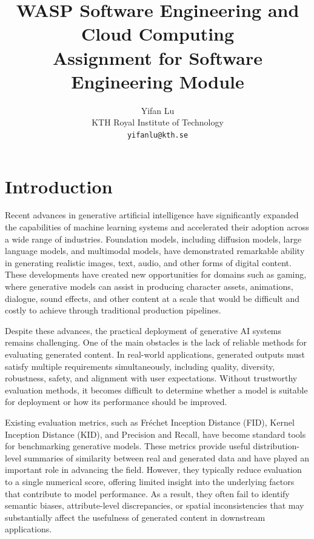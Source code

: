 \documentclass{article}
\title{WASP Software Engineering and Cloud Computing\\ \small{Assignment for Software Engineering Module}}
\author{
  Yifan Lu \\
  KTH Royal Institute of Technology\\
  \texttt{yifanlu@kth.se} \\
}
\begin{document}
\maketitle






\section{Introduction}

Recent advances in generative artificial intelligence have significantly expanded the capabilities of machine learning systems and accelerated their adoption across a wide range of industries. Foundation models, including diffusion models\cite{sohl2015deep, ho2020denoising, nichol2021improved, rombach2022high}, large language models\cite{brown2020language, ouyang2022training}, and multimodal models\cite{radford2021learning, liu2023visual}, have demonstrated remarkable ability in generating realistic images\cite{ho2020denoising, rombach2022high}, text\cite{brown2020language, ouyang2022training}, audio\cite{huang2023make}, and other forms of digital content. These developments have created new opportunities for domains such as gaming, where generative models can assist in producing character assets, animations, dialogue, sound effects, and other content at a scale that would be difficult and costly to achieve through traditional production pipelines.

Despite these advances, the practical deployment of generative AI systems remains challenging. One of the main obstacles is the lack of reliable methods for evaluating generated content. In real-world applications, generated outputs must satisfy multiple requirements simultaneously, including quality, diversity, robustness, safety, and alignment with user expectations. Without trustworthy evaluation methods, it becomes difficult to determine whether a model is suitable for deployment or how its performance should be improved.

Existing evaluation metrics, such as Fréchet Inception Distance (FID)\cite{heusel2017gans}, Kernel Inception Distance (KID)\cite{binkowski2018demystifying}, and Precision and Recall\cite{sajjadi2018assessing}, have become standard tools for benchmarking generative models. These metrics provide useful distribution-level summaries of similarity between real and generated data and have played an important role in advancing the field. However, they typically reduce evaluation to a single numerical score, offering limited insight into the underlying factors that contribute to model performance. As a result, they often fail to identify semantic biases, attribute-level discrepancies, or spatial inconsistencies that may substantially affect the usefulness of generated content in downstream applications.
\end{document}
